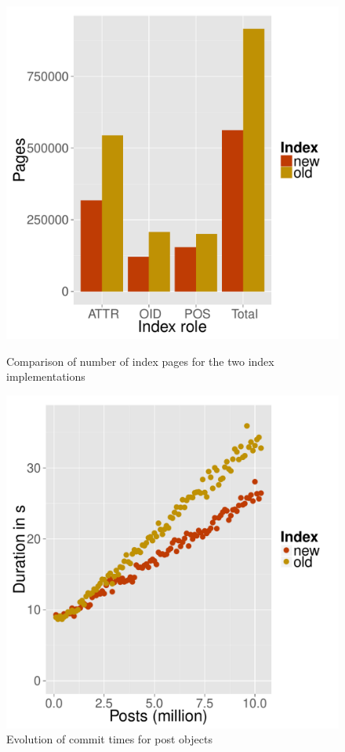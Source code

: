 \documentclass[11pt,a4paper,oneside]{article}
\begin{document}
\begin{figure}[h]
    \begin{minipage}{0.45\textwidth}
    \centering
	\includegraphics[scale=0.37]{images/SO_sizes.pdf} 	
	\caption{Comparison of number of index pages for the two index implementations}
	\label{fig:so-sizes}
	\end{minipage}
	\hspace{0.5cm}
	\begin{minipage}{0.45\textwidth}
	\centering
	\includegraphics[scale=0.37]{images/SO_commit_duration.pdf} 
	\caption{Evolution of commit times for post objects}
	\label{fig:so-commits}
	\end{minipage}
\end{figure}
\end{document}
